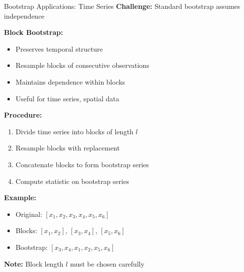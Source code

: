 \documentclass[aspectratio=169]{beamer}
\begin{document}
\begin{frame}{Bootstrap Applications: Time Series}
\footnotesize
\textbf{Challenge:} Standard bootstrap assumes independence

\vspace{0.1cm}
\textbf{Block Bootstrap:}
\begin{itemize}
    \item Preserves temporal structure
    \item Resample blocks of consecutive observations
    \item Maintains dependence within blocks
    \item Useful for time series, spatial data
\end{itemize}

\vspace{0.1cm}
\textbf{Procedure:}
\begin{enumerate}
    \item Divide time series into blocks of length $l$
    \item Resample blocks with replacement
    \item Concatenate blocks to form bootstrap series
    \item Compute statistic on bootstrap series
\end{enumerate}

\vspace{0.1cm}
\textbf{Example:}
\begin{itemize}
    \item Original: $[x_1, x_2, x_3, x_4, x_5, x_6]$
    \item Blocks: $[x_1, x_2]$, $[x_3, x_4]$, $[x_5, x_6]$
    \item Bootstrap: $[x_3, x_4, x_1, x_2, x_5, x_6]$
\end{itemize}

\vspace{0.05cm}
\textbf{Note:} Block length $l$ must be chosen carefully
\end{frame}
\end{document}
